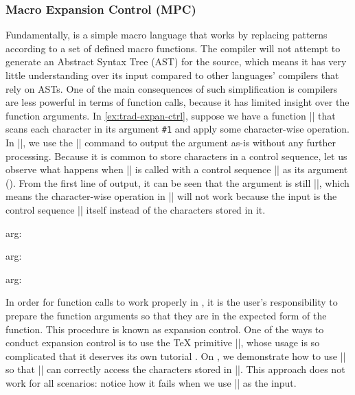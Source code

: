 \documentclass{ltugboat}
\begin{document}
\subsubsection{Macro Expansion Control (MPC)}\label{sec:intro-macro-expansion-control}
Fundamentally, \LT{} is a simple macro language that works by replacing patterns according to a set of defined macro functions.
The \LT{} compiler will not attempt to generate an Abstract Syntax Tree (AST) for the \LT{} source, which means it has very little understanding over its input compared to other languages' compilers that rely on ASTs.
One of the main consequences of such simplification is \LT{} compilers are less powerful in terms of function calls, because it has limited insight over the function arguments.
In \cref{ex:trad-expan-ctrl}, suppose we have a function \inltex|\cmda| that scans each character in its argument \verb|#1| and apply some character-wise operation. 
In \inltex|\cmda|, we use the \inltex|\detokenize| command to output the argument as-is without any further processing.
Because it is common to store characters in a control sequence, let us observe what happens when \inltex|\cmda| is called with a control sequence \inltex|\vala| as its argument ().
From the first line of output, it can be seen that the argument is still \inltex|\vala|, which means the character-wise operation in \inltex|\cmda| will not work because the input is the control sequence \inltex|\cmda| itself instead of the characters stored in it.
\begin{latexsample}[examplelabel=ex:trad-expan-ctrl,exampletitle={Expansion Control},noexport]
\def\cmda#1{%
  arg: \detokenize{#1} %
}
\def\vala{val-a}
\def\valb{\vala}
\par\cmda{\vala}
\par\expandafter\expandafter\expandafter\cmda\expandafter{\vala}
\par\expandafter\expandafter\expandafter\cmda\expandafter{\valb}
\end{latexsample}
\noindent In order for function calls to work properly in \LT{}, it is the user's responsibility to prepare the function arguments so that they are in the expected form of the function.
This procedure is known as expansion control.
One of the ways to conduct expansion control is to use the \TeX{} primitive \inltex|\expandafter|, whose usage is so complicated that it deserves its own tutorial \cite{bechtolsheim1988tutorial}.
On , we demonstrate how to use \inltex|\expandafter| so that \inltex|\cmda| can correctly access the characters stored in \inltex|\vala|.
This approach does not work for all scenarios: notice how it fails when we use \inltex|\valb| as the input.
\end{document}
